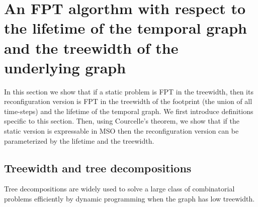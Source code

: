 \section{An FPT algorthm with respect to the lifetime of the temporal graph and the treewidth of the underlying graph}
\label{sec:tw algo}
In this section we show that if a static problem is FPT in the treewidth, then its reconfiguration version is FPT in the treewidth of the footprint (the union of all time-steps) and the lifetime of the temporal graph.
We first introduce definitions specific to this section. Then, using Courcelle's theorem, we show that if the static version is expressable in MSO then the reconfiguration version can be parameterized by the lifetime and the treewidth.




\subsection{Treewidth and tree decompositions}

Tree decompositions are widely used to solve a large class of combinatorial problems efficiently by dynamic programming when the graph has low treewidth. 

